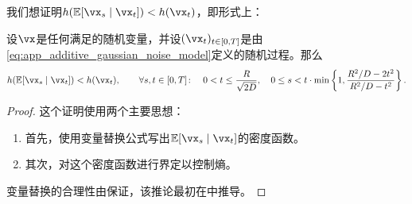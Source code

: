 \documentclass[../../book-main_zh.tex]{subfiles}
\begin{document}
我们想证明\(h(\Ex[\vx_{s} \mid \vx_{t}]) < h(\vx_{t})\)，即形式上：
\begin{theorem}\label{thm:conditioning_reduces_entropy}
    设\(\vx\)是任何满足的随机变量，并设\((\vx_{t})_{t \in [0, T]}\)是由\eqref{eq:app_additive_gaussian_noise_model}定义的随机过程。那么
    \begin{equation}
        h(\Ex[\vx_{s} \mid \vx_{t}]) < h(\vx_{t}), \qquad \forall s, t \in [0, T] \colon \quad 0 < t \leq \frac{R}{\sqrt{2D}}, \quad 0 \leq s  < t\cdot\min\bc{1, \frac{R^{2}/D - 2t^{2}}{R^{2}/D - t^{2}}}.
    \end{equation}
\end{theorem}
\begin{proof}
    这个证明使用两个主要思想：
    \begin{enumerate}
        \item 首先，使用变量替换公式写出\(\Ex[\vx_{s} \mid \vx_{t}]\)的密度函数。
        \item 其次，对这个密度函数进行界定以控制熵。
    \end{enumerate}
    变量替换的合理性由保证，该推论最初在\cite{Gribonval2011-pf}中推导。


\end{proof}
\end{document}
